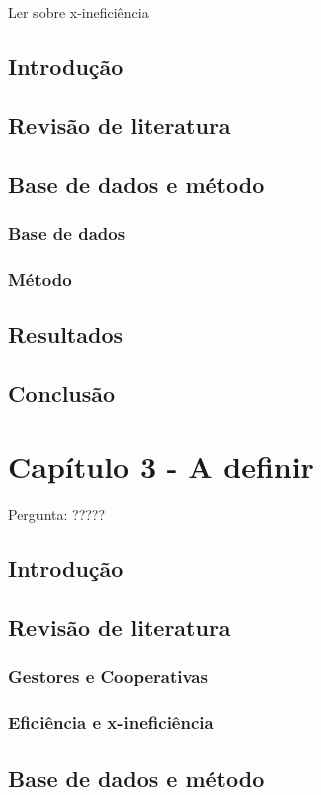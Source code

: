 \documentclass[ppgcc]{fearp}
\begin{document}
Ler sobre x-ineficiência

\section{Introdução}
\section{Revisão de literatura}
\section{Base de dados e método}
\subsection{Base de dados}
\subsection{Método}
\section{Resultados}
\section{Conclusão}


\chapter{Capítulo 3 - A definir}

Pergunta: ?????

\section{Introdução}
\section{Revisão de literatura}
\subsection{Gestores e Cooperativas}
\subsection{Eficiência e x-ineficiência}
\section{Base de dados e método}
\end{document}
